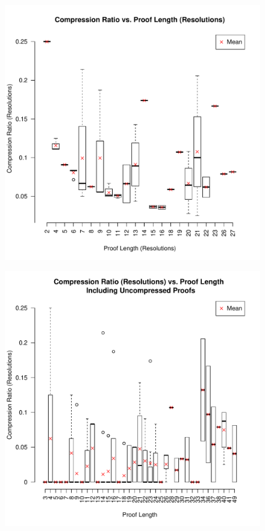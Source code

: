 \begin{figure}
\includegraphics[scale=0.5]{images/compress_ratio_res_vs_proof_length_res.pdf}
\end{figure}

\begin{figure}
\includegraphics[scale=0.5]{images/compress_ratio_res_vs_proof_length_all_proofs.pdf}
\end{figure}

